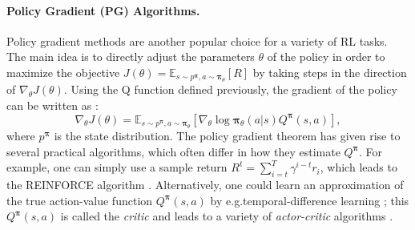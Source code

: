 \documentclass{article}
\newcommand{\pol}[0]{\pmb{\pi}}
\begin{document}
\paragraph{Policy Gradient (PG) Algorithms.} Policy gradient methods are another popular choice for a variety of RL tasks.
The main idea is to directly adjust the parameters $\theta$ of the policy in order to maximize the objective $J(\theta) = \mathbb{E}_{s \sim p^{\pol}, a \sim {\pol}_\theta}[R]$ by taking steps in the direction of $\nabla_\theta J(\theta)$. Using the Q function defined previously, the gradient of the policy can be written as \cite{sutton2000policy}:
\begin{equation}
\nabla_\theta J(\theta) = \mathbb{E}_{s \sim p^{\pol}, a \sim {\pol}_\theta} [\nabla_\theta \log \pol_\theta(a|s) Q^{\pol} (s,a)],
\end{equation}
where $p^{\pol}$ is the state distribution. %
The policy gradient theorem has given rise to several practical algorithms, which often differ in how they estimate $Q^{\pol}$. For example, one can simply use a sample return $R^t = \sum_{i=t}^T \gamma^{i-t}r_i$, which leads to the REINFORCE algorithm \cite{williams1992simple}. 
Alternatively, one could learn an approximation of the true action-value function $Q^{\pol}(s,a)$ by e.g.\@ temporal-difference learning \cite{sutton1998reinforcement}; 
this $Q^{\pol}(s,a)$ is called the \textit{critic} and leads to a variety of \textit{actor-critic} algorithms \cite{sutton1998reinforcement}.
\end{document}

